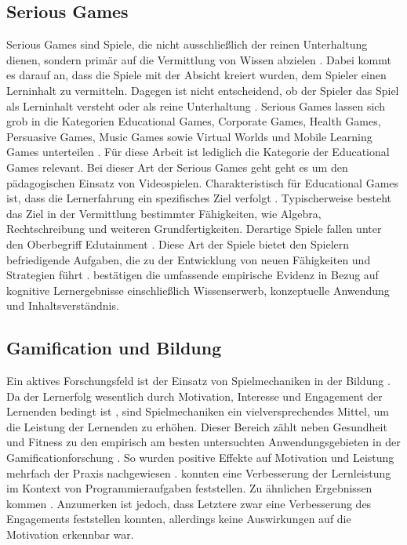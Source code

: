 \subsection{Serious Games}
Serious Games sind Spiele, die nicht ausschließlich der reinen Unterhaltung dienen, sondern primär auf die Vermittlung von Wissen abzielen \cite[S.17]{michael_serious_2005}.
Dabei kommt es darauf an, dass die Spiele mit der Absicht kreiert wurden, dem Spieler einen Lerninhalt zu vermitteln.
Dagegen ist nicht entscheidend, ob der Spieler das Spiel als Lerninhalt versteht oder als reine Unterhaltung \cite[S.3]{bopp_serious_2009}.
Serious Games lassen sich grob in die Kategorien Educational  Games, 
Corporate  Games,  Health  Games,  Persuasive  Games,  Music  Games  sowie  Virtual  Worlds  und 
Mobile Learning Games unterteilen \cite[S.4]{bopp_serious_2009}.
Für diese Arbeit ist lediglich die Kategorie der Educational  Games relevant.
Bei dieser Art der Serious Games geht geht es um den pädagogischen Einsatz von Videospielen.
Charakteristisch für Educational  Games ist, dass die Lernerfahrung ein spezifisches Ziel verfolgt \cite{nielsen_overview_2006, bopp_serious_2009}.
Typischerweise besteht das Ziel in der Vermittlung bestimmter Fähigkeiten, wie Algebra, Rechtschreibung und weiteren Grundfertigkeiten.
Derartige Spiele fallen unter den Oberbegriff Edutainment \cite{nielsen_overview_2006}.
Diese Art der Spiele bietet den Spielern befriedigende Aufgaben, die zu der Entwicklung von neuen Fähigkeiten und Strategien führt \cite{stapleton_serious_2004}.
\citeauthor{vlachopoulos_effect_2017} bestätigen die umfassende empirische Evidenz in Bezug auf kognitive Lernergebnisse einschließlich Wissenserwerb, konzeptuelle Anwendung und Inhaltsverständnis.


\subsection{Gamification und Bildung}
Ein aktives Forschungsfeld ist der Einsatz von Spielmechaniken in der Bildung \cite{ibanez_gamification_2014,landers_enhancing_2017}. Da der Lernerfolg wesentlich durch Motivation, Interesse und Engagement der Lernenden bedingt ist \cite{astin_student_1984}, sind Spielmechaniken ein vielversprechendes Mittel, um die Leistung der Lernenden zu erhöhen.
Dieser Bereich zählt neben Gesundheit und Fitness zu den empirisch am besten untersuchten Anwendungsgebieten in der Gamificationforschung \cite{koivisto_rise_2019}.
So wurden positive Effekte auf Motivation und Leistung mehrfach der Praxis nachgewiesen \cite{ibanez_gamification_2014,hamzah_influence_2015,strmecki_gamification_2015}. \cite{layth_khaleel_empirical_2019} konnten eine Verbesserung der Lernleistung im Kontext von Programmieraufgaben feststellen. Zu ähnlichen Ergebnissen kommen \cite{ortiz_gamification_2017}. Anzumerken ist jedoch, dass Letztere zwar eine Verbesserung des Engagements feststellen konnten, allerdings keine Auswirkungen auf die Motivation erkennbar war.


